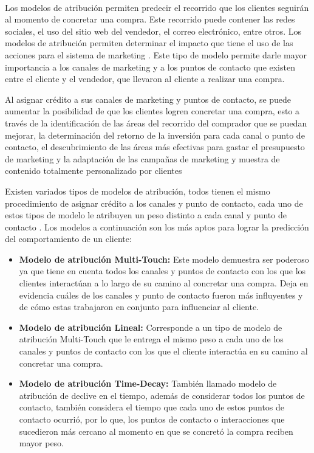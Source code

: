 \\
Los modelos de atribución permiten predecir el recorrido que los clientes seguirán al momento de concretar una compra. Este recorrido puede contener las redes sociales, el uso del sitio web del vendedor, el correo electrónico, entre otros. Los modelos de atribución permiten determinar el impacto que tiene el uso de las acciones para el sistema de marketing \cite{modelo-atribucion}. Este tipo de modelo permite darle mayor importancia a los canales de marketing y a los puntos de contacto que existen entre el cliente y el vendedor, que llevaron al cliente a realizar una compra.

Al asignar crédito a sus canales de marketing y puntos de contacto, se puede aumentar la posibilidad de que los clientes logren concretar una compra, esto a través de la identificación de las áreas del recorrido del comprador que se puedan mejorar, la determinación del retorno de la inversión para cada canal o punto de contacto, el descubrimiento de las áreas más efectivas para gastar el presupuesto de marketing y la adaptación de las campañas de marketing y muestra de contenido totalmente personalizado por clientes \cite{modelo-atribucion}

Existen variados tipos de modelos de atribución, todos tienen el mismo procedimiento de asignar crédito a los canales y punto de contacto, cada uno de estos tipos de modelo le atribuyen un peso distinto a cada canal y punto de contacto \cite{modelo-atribucion}. Los modelos a continuación son los más aptos para lograr la predicción del comportamiento de un cliente:

\begin{itemize}
    \item \textbf{Modelo de atribución Multi-Touch:} Este modelo demuestra ser poderoso ya que tiene en cuenta todos los canales y puntos de contacto con los que los clientes interactúan a lo largo de su camino al concretar una compra. Deja en evidencia cuáles de los canales y punto de contacto fueron más influyentes y de cómo estas trabajaron en conjunto para influenciar al cliente.
    \item \textbf{Modelo de atribución Lineal:} Corresponde a un tipo de modelo de atribución Multi-Touch que le entrega el mismo peso a cada uno de los canales y puntos de contacto con los que el cliente interactúa en su camino al concretar una compra.
    \item \textbf{Modelo de atribución Time-Decay:} También llamado modelo de atribución de declive en el tiempo, además de considerar todos los puntos de contacto, también considera el tiempo que cada uno de estos puntos de contacto ocurrió, por lo que, los puntos de contacto o interacciones que sucedieron más cercano al momento en que se concretó la compra reciben mayor peso.
\end{itemize}

